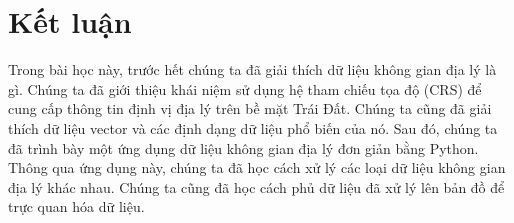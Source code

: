 \section{Kết luận}

Trong bài học này, trước hết chúng ta đã giải thích dữ liệu không gian địa lý là gì. Chúng ta đã giới thiệu khái niệm sử dụng hệ tham chiếu tọa độ (CRS) để cung cấp thông tin định vị địa lý trên bề mặt Trái Đất. Chúng ta cũng đã giải thích dữ liệu vector và các định dạng dữ liệu phổ biến của nó. Sau đó, chúng ta đã trình bày một ứng dụng dữ liệu không gian địa lý đơn giản bằng Python. Thông qua ứng dụng này, chúng ta đã học cách xử lý các loại dữ liệu không gian địa lý khác nhau. Chúng ta cũng đã học cách phủ dữ liệu đã xử lý lên bản đồ để trực quan hóa dữ liệu.
